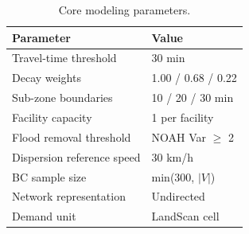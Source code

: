 \documentclass[9pt,twocolumn,twoside]{pnas-new}
\begin{document}
\begin{table}[t!]
\centering
\caption{Core modeling parameters.}
\label{tab:parameters}
\begin{tabular}{ll}
Parameter & Value \\
\midrule
Travel-time threshold & 30 min \\
Decay weights & 1.00 / 0.68 / 0.22 \\
Sub-zone boundaries & 10 / 20 / 30 min \\
Facility capacity & 1 per facility \\
Flood removal threshold & NOAH Var $\geq$ 2 \\
Dispersion reference speed & 30 km/h \\
BC sample size & min(300, $|V|$) \\
Network representation & Undirected \\
Demand unit & LandScan cell \\
\bottomrule
\end{tabular} \\
\end{table}
\end{document}
